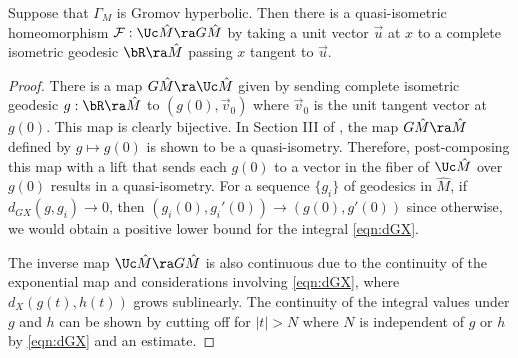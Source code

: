 \begin{lemma} \label{lem:identify} 
	Suppose that $\Gamma_M$ is Gromov hyperbolic. 
	Then there is a quasi-isometric homeomorphism $\mathcal{F}:\Uc \hat M \ra G\hat M$
	by taking a unit vector $\vec{u}$ at $x$ to a complete isometric geodesic 
	$\bR \ra \hat M$ passing $x$ tangent to $\vec{u}$. 
	\end{lemma} 
\begin{proof}
There is a map $G\hat{M} \ra \Uc \hat{M}$ given by sending  complete isometric geodesic $g: \bR \ra \hat{M}$ to $(g(0), \vec{v}_0)$ where $\vec{v}_0$ is the unit tangent vector at $g(0)$. This map is clearly bijective. In Section III of \cite{Matheus90}, the map $G\hat{M} \ra \hat{M}$ defined by $g \mapsto g(0)$ is shown to be a quasi-isometry. Therefore, post-composing this map with a lift that sends each $g(0)$ to a vector in the fiber of $\Uc \hat{M}$ over $g(0)$ results in a quasi-isometry. For a sequence $\{g_i\}$ of geodesics in $\hat{M}$, if $d_{GX}(g, g_i) \to 0$, then $(g_i(0), g_i'(0)) \to (g(0), g'(0))$ since otherwise, we would obtain a positive lower bound for the integral \eqref{eqn:dGX}.

The inverse map $\Uc \hat{M} \ra G\hat{M}$ is also continuous due to the continuity of the exponential map and considerations involving \eqref{eqn:dGX}, where $d_X(g(t), h(t))$ grows sublinearly. The continuity of the integral values under $g$ and $h$ can be shown by cutting off for $|t| > N$ where $N$ is independent of $g$ or $h$ by \eqref{eqn:dGX} and an estimate. 


	
	\end{proof} 



